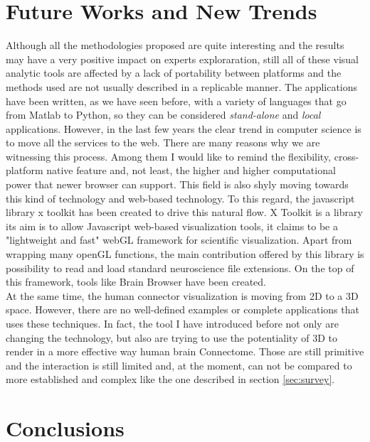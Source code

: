 \documentclass{article}
\begin{document}
\begin{multicols}{2}
\section{Future Works and New Trends}
\label{sec:futureWorks}
Although all the methodologies proposed are quite interesting and the results may have a very positive impact on experts exploraration, still all of these visual analytic tools are affected by a lack of portability between platforms and the methods used are not usually described in a replicable manner. The applications have been written, as we have seen before, with a variety of languages that go from Matlab to Python, so they can be considered \textit{stand-alone} and \textit{local} applications. However, in the last few years the clear trend in computer science is to move all the services to the web. There are many reasons why we are witnessing this process. Among them I would like to remind the flexibility, cross-platform native feature and, not least, the higher and higher computational power that newer browser can support. This field is also shyly moving towards this kind of technology and web-based technology. To this regard, the javascript library x toolkit \cite{xToolkit} has been created to drive this natural flow. X Toolkit is a library its aim is to allow Javascript web-based visualization tools, it claims to be a "lightweight and fast" webGL framework for scientific visualization. Apart from wrapping many openGL functions, the main contribution offered by this library is possibility to read and load standard neuroscience file extensions. On the top of this framework, tools like Brain Browser \cite{brainBrowser} have been created. \\

At the same time, the human connector visualization is moving from 2D to a 3D space. However, there are no well-defined examples or complete applications that uses these techniques. In fact, the tool I have introduced before not only are changing the technology, but also are trying to use the potentiality of 3D to render in a more effective way human brain Connectome. Those are still primitive and the interaction is still limited and, at the moment, can not be compared to more established and complex like the one described in section \ref{sec:survey}.

\section{Conclusions}
\label{sec:conclusions}
{}
  





\end{multicols}
\end{document}

